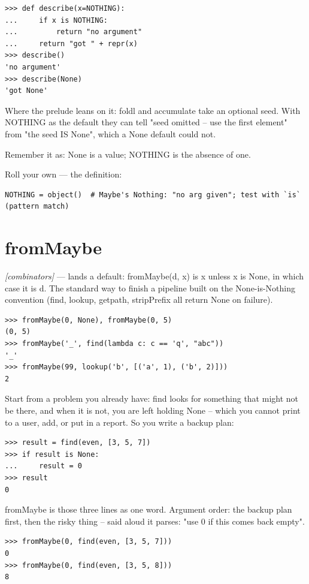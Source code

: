 \documentclass[11pt,letterpaper]{book}
\begin{document}
\begin{lstlisting}[style=spec]
>>> def describe(x=NOTHING):
...     if x is NOTHING:
...         return "no argument"
...     return "got " + repr(x)
>>> describe()
'no argument'
>>> describe(None)
'got None'
\end{lstlisting}

Where the prelude leans on it: foldl and accumulate take an optional seed. With NOTHING as the default they can tell "seed omitted -- use the first element" from "the seed IS None", which a None default could not.


Remember it as: None is a value; NOTHING is the absence of one.


Roll your own --- the definition:

\begin{lstlisting}[style=code]
NOTHING = object()  # Maybe's Nothing: "no arg given"; test with `is` (pattern match)
\end{lstlisting}

\section{fromMaybe}
\noindent\textit{[combinators]} --- lands a default: fromMaybe(d, x) is x unless x is None, in which case it is d. The standard way to finish a pipeline built on the None-is-Nothing convention (find, lookup, getpath, stripPrefix all return None on failure).
\begin{lstlisting}[style=spec]
>>> fromMaybe(0, None), fromMaybe(0, 5)
(0, 5)
>>> fromMaybe('_', find(lambda c: c == 'q', "abc"))
'_'
>>> fromMaybe(99, lookup('b', [('a', 1), ('b', 2)]))
2
\end{lstlisting}

Start from a problem you already have: find looks for something that might not be there, and when it is not, you are left holding None -- which you cannot print to a user, add, or put in a report. So you write a backup plan:

\begin{lstlisting}[style=spec]
>>> result = find(even, [3, 5, 7])
>>> if result is None:
...     result = 0
>>> result
0
\end{lstlisting}

fromMaybe is those three lines as one word. Argument order: the backup plan first, then the risky thing -- said aloud it parses: "use 0 if this comes back empty".

\begin{lstlisting}[style=spec]
>>> fromMaybe(0, find(even, [3, 5, 7]))
0
>>> fromMaybe(0, find(even, [3, 5, 8]))
8
\end{lstlisting}
\end{document}
